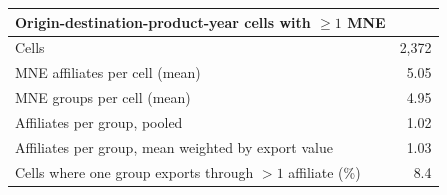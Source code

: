 \begin{tabular}{lr}
\toprule
Origin-destination-product-year cells with $\geq 1$ MNE & \\
\midrule
Cells & 2,372 \\
MNE affiliates per cell (mean) & 5.05 \\
MNE groups per cell (mean) & 4.95 \\
Affiliates per group, pooled & 1.02 \\
Affiliates per group, mean weighted by export value & 1.03 \\
Cells where one group exports through $>1$ affiliate (\%) & 8.4 \\
\bottomrule
\end{tabular}

